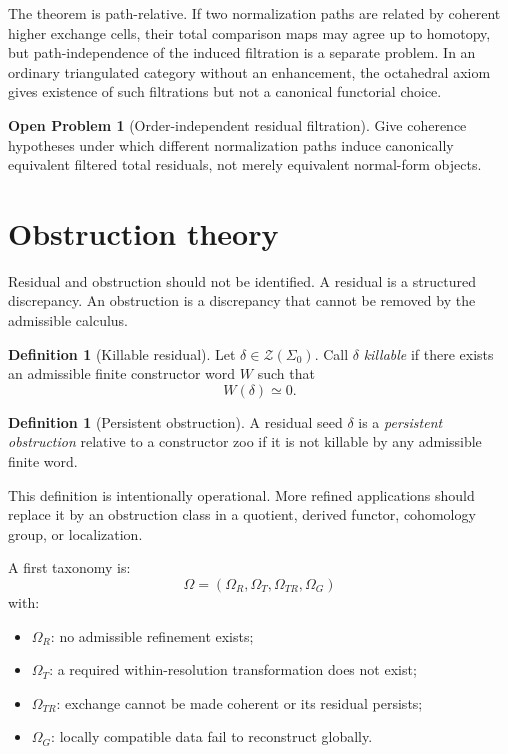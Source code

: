 \documentclass[11pt]{article}
\theoremstyle{definition}
\newtheorem{definition}[theorem]{Definition}
\newtheorem{problem}[theorem]{Open Problem}
\theoremstyle{remark}
\newcommand{\Zoo}{\mathcal Z}
\newcommand{\Seeds}{\Sigma}
\begin{document}
The theorem is path-relative. If two normalization paths are related by coherent higher exchange cells, their total comparison maps may agree up to homotopy, but path-independence of the induced filtration is a separate problem. In an ordinary triangulated category without an enhancement, the octahedral axiom gives existence of such filtrations but not a canonical functorial choice.

\begin{problem}[Order-independent residual filtration]\label{prob:path-independent}
Give coherence hypotheses under which different normalization paths induce canonically equivalent filtered total residuals, not merely equivalent normal-form objects.
\end{problem}

\section{Obstruction theory}

Residual and obstruction should not be identified. A residual is a structured discrepancy. An obstruction is a discrepancy that cannot be removed by the admissible calculus.

\begin{definition}[Killable residual]
Let $\delta\in\Zoo(\Seeds_0)$. Call $\delta$ \emph{killable} if there exists an admissible finite constructor word $W$ such that
\[
W(\delta)\simeq0.
\]
\end{definition}

\begin{definition}[Persistent obstruction]
A residual seed $\delta$ is a \emph{persistent obstruction} relative to a constructor zoo if it is not killable by any admissible finite word.
\end{definition}

This definition is intentionally operational. More refined applications should replace it by an obstruction class in a quotient, derived functor, cohomology group, or localization.

A first taxonomy is:
\[
\boxed{
\Omega=(\Omega_R,\Omega_T,\Omega_{TR},\Omega_G)
}
\]
with:
\begin{itemize}
    \item $\Omega_R$: no admissible refinement exists;
    \item $\Omega_T$: a required within-resolution transformation does not exist;
    \item $\Omega_{TR}$: exchange cannot be made coherent or its residual persists;
    \item $\Omega_G$: locally compatible data fail to reconstruct globally.
\end{itemize}
\end{document}
